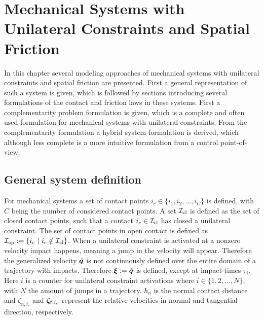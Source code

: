 \documentclass[../DC2017114Bouma.tex]{subfiles}
\begin{document}
\graphicspath{{02_Material/img/}}
\renewcommand{\chaptermark}[1]{\markboth{\thechapter.\ #1}{}}
\renewcommand{\sectionmark}[1]{\markright{#1}{}}
\pagestyle{fancyreport}
\cleartooddpage
\pagestyle{fancyreport}
\chapter{Mechanical Systems with Unilateral Constraints and Spatial Friction}\label{ch:model}
In this chapter several modeling approaches of mechanical systems with unilateral constraints and spatial friction are presented. First a general representation of such a system is given, which is followed by sections introducing several formulations of the contact and friction laws in these systems. First a complementarity problem formulation is given, which is a complete and often used formulation for mechanical systems with unilateral constraints. From the complementarity formulation a hybrid system formulation is derived, which although less complete is a more intuitive formulation from a control point-of-view.
\section{General system definition}
For mechanical systems a set of contact points $i_c\in\{i_1,i_2,...,i_C\}$ is defined, with $C$ being the number of considered contact points. A set $\mathcal{I}_{\text{cl}}$ is defined as the set of closed contact points, such that a contact $i_c\in\mathcal{I}_{\text{cl}}$ has closed a unilateral constraint. The set of contact points in open contact is defined as $\Ic_{\text{op}} := \{i_c\ |\ i_c\notin\Ic_{\text{cl}}\}$. When a unilateral constraint is activated at a nonzero velocity impact happens, meaning a jump in the velocity will appear. Therefore the generalized velocity $\dot{{\boldsymbol{q}}}$ is not continuously defined over the entire domain of a trajectory with impacts. Therefore $\boldsymbol{\xi}:=\dot{{\boldsymbol{q}}}$ is defined, except at impact-times $\tau_i$. Here $i$ is a counter for unilateral constraint activations where $i\in \{1,2,...,N\}$, with $N$ the amount of jumps in a trajectory. $h_n$ is the normal contact distance and $\zeta_{n,i_c}$ and $\boldsymbol{\zeta}_{t,i_c}$ represent the relative velocities in normal and tangential direction,  respectively. 
\end{document}
